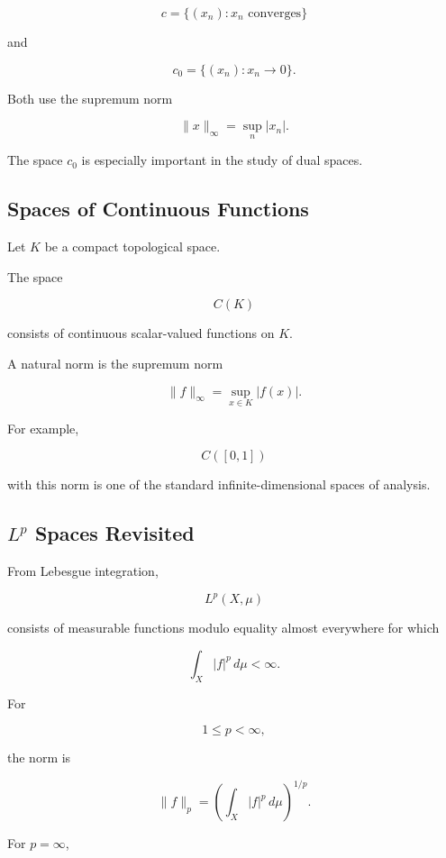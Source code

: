 \[
\boxed{
c
=
\{(x_n):x_n\text{ converges}\}
}
\]

and

\[
\boxed{
c_0
=
\{(x_n):x_n\to0\}.
}
\]

Both use the supremum norm

\[
\boxed{
\|x\|_\infty
=
\sup_n|x_n|.
}
\]

The space \(c_0\) is especially important in the study of dual spaces.

\subsection{Spaces of Continuous Functions}
\label{subsec:continuous-function-spaces}

Let \(K\) be a compact topological space.

The space

\[
\boxed{
C(K)
}
\]

consists of continuous scalar-valued functions on \(K\).

A natural norm is the supremum norm

\[
\boxed{
\|f\|_\infty
=
\sup_{x\in K}|f(x)|.
}
\]

For example,

\[
C([0,1])
\]

with this norm is one of the standard infinite-dimensional spaces of
analysis.

\subsection{\(L^p\) Spaces Revisited}
\label{subsec:lp-functional-analysis}

From Lebesgue integration,

\[
L^p(X,\mu)
\]

consists of measurable functions modulo equality almost everywhere for
which

\[
\int_X|f|^p\,d\mu<\infty.
\]

For

\[
1\leq p<\infty,
\]

the norm is

\[
\boxed{
\|f\|_p
=
\left(
\int_X|f|^p\,d\mu
\right)^{1/p}.
}
\]

For \(p=\infty\),

